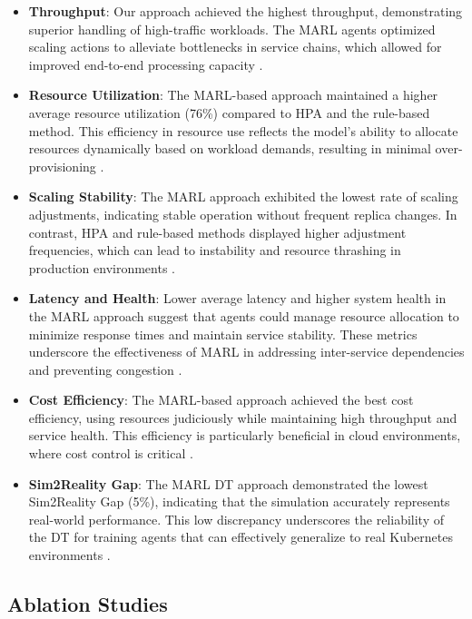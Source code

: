 \documentclass[conference]{IEEEtran}
\begin{document}
\begin{itemize}
    \item \textbf{Throughput}: Our approach achieved the highest throughput, demonstrating superior handling of high-traffic workloads. The MARL agents optimized scaling actions to alleviate bottlenecks in service chains, which allowed for improved end-to-end processing capacity \cite{zhang_marl_k8s}.
    \item \textbf{Resource Utilization}: The MARL-based approach maintained a higher average resource utilization (76\%) compared to HPA and the rule-based method. This efficiency in resource use reflects the model's ability to allocate resources dynamically based on workload demands, resulting in minimal over-provisioning \cite{nguyen_sim2reality}.
    \item \textbf{Scaling Stability}: The MARL approach exhibited the lowest rate of scaling adjustments, indicating stable operation without frequent replica changes. In contrast, HPA and rule-based methods displayed higher adjustment frequencies, which can lead to instability and resource thrashing in production environments \cite{hpa_design}.
    \item \textbf{Latency and Health}: Lower average latency and higher system health in the MARL approach suggest that agents could manage resource allocation to minimize response times and maintain service stability. These metrics underscore the effectiveness of MARL in addressing inter-service dependencies and preventing congestion \cite{tan_nn_resource_approx}.
    \item \textbf{Cost Efficiency}: The MARL-based approach achieved the best cost efficiency, using resources judiciously while maintaining high throughput and service health. This efficiency is particularly beneficial in cloud environments, where cost control is critical \cite{liu_dt_cloud}.
    \item \textbf{Sim2Reality Gap}: The MARL DT approach demonstrated the lowest Sim2Reality Gap (5\%), indicating that the simulation accurately represents real-world performance. This low discrepancy underscores the reliability of the DT for training agents that can effectively generalize to real Kubernetes environments \cite{schleich_digital_twin}.
\end{itemize}

\subsection{Ablation Studies}
\end{document}
